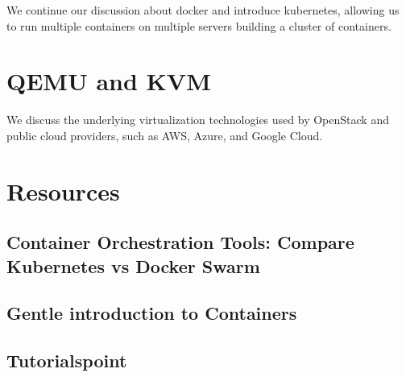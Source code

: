 We continue our discussion about docker and introduce kubernetes,
allowing us to run multiple containers on multiple servers building a
cluster of containers.


\section{QEMU and KVM}
\label{s:motivation-qemu-kvm}

We discuss the underlying virtualization technologies used by OpenStack and
public cloud providers, such as AWS, Azure, and Google Cloud.


\section{Resources}

\subsection{Container Orchestration Tools: Compare Kubernetes vs Docker Swarm}


\subsection{Gentle introduction to Containers}


\subsection{Tutorialspoint}



